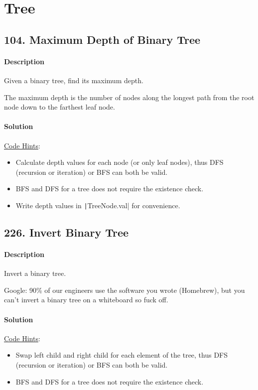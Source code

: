 \section{Tree}

\subsection{104. Maximum Depth of Binary Tree}

\paragraph{Description}

Given a binary tree, find its maximum depth.

The maximum depth is the number of nodes along the longest path from the root node down to the farthest leaf node.

\paragraph{Solution}

\underline{Code Hints}:
\begin{itemize}
    \item Calculate depth values for each node (or only leaf nodes), thus DFS (recursion or iteration) or BFS can both be valid.
    \item BFS and DFS for a tree does not require the existence check.
    \item Write depth values in \texttt|TreeNode.val| for convenience.
\end{itemize}

\subsection{226. Invert Binary Tree}

\paragraph{Description}

Invert a binary tree.

Google: 90\% of our engineers use the software you wrote (Homebrew), but you can’t invert a binary tree on a whiteboard so fuck off.

\paragraph{Solution}

\underline{Code Hints}:
\begin{itemize}
    \item Swap left child and right child for each element of the tree, thus DFS (recursion or iteration) or BFS can both be valid.
    \item BFS and DFS for a tree does not require the existence check.
\end{itemize}